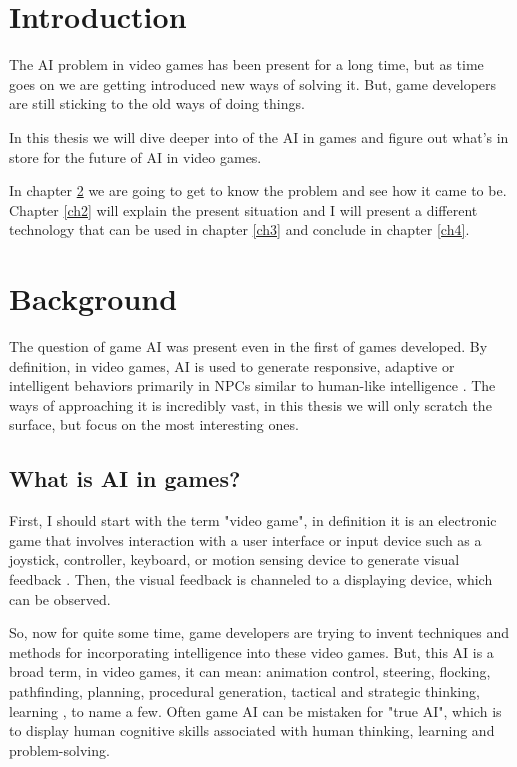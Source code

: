 \documentclass[a4paper, 12pt]{book}
\begin{document}

\mainmatter
\setcounter{page}{1}
\pagestyle{fancy}


\chapter{Introduction}

The AI problem in video games has been present for a long time, but as time goes on we are getting introduced new ways of solving it. But, game developers are still sticking to the old ways of doing things. %

In this thesis we will dive deeper into of the AI in games and figure out what's in store for the future of AI in video games.

In chapter \ref{ch1} we are going to get to know the problem and see how it came to be.
Chapter \ref{ch2} will explain the present situation and I will present a different technology that can be used in chapter \ref{ch3} and conclude in chapter \ref{ch4}.


\chapter{Background}
\label{ch1}
The question of game AI was present even in the first of games developed. By definition, in video games, AI is used to generate responsive, adaptive or intelligent behaviors primarily in NPCs similar to human-like intelligence \cite{AIwiki}. The ways of approaching it is incredibly vast, in this thesis we will only scratch the surface, but focus on the most interesting ones.


\section{What is AI in games?}
First, I should start with the term "video game", in definition it is an electronic game that involves interaction with a user interface or input device such as a joystick, controller, keyboard, or motion sensing device to generate visual feedback \cite{VideoGameWiki}. Then, the visual feedback is channeled to a displaying device, which can be observed. 

So, now for quite some time, game developers are trying to invent techniques and methods for incorporating intelligence into these video games. But, this AI is a broad term, in video games, it can mean: animation control, steering, flocking, pathfinding, planning, procedural generation, tactical and strategic thinking, learning \cite{FuzzyAIGames}, to name a few. Often game AI can be mistaken for "true AI", which is to display human cognitive skills associated with human thinking, learning and problem-solving.
\end{document}
